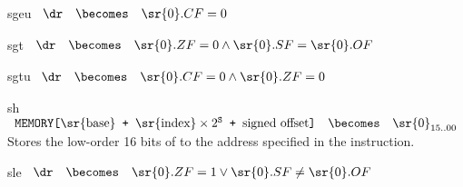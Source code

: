 \begin{instruction}{sgeu}
     {\sgeuopc}
     {
       \begin{math}
         \begin{array}{lcl}
           \dr & \becomes & \sr{0}.CF = 0 \\
         \end{array}
       \end{math}
     }
\end{instruction}


\begin{instruction}{sgt}
     {\sgtopc}
     {
       \begin{math}
         \begin{array}{lcl}
           \dr & \becomes & \sr{0}.ZF = 0 \wedge \sr{0}.SF = \sr{0}.OF \\
         \end{array}
       \end{math}
     }
\end{instruction}


\begin{instruction}{sgtu}
     {\sgtuopc}
     {
       \begin{math}
         \begin{array}{lcl}
           \dr & \becomes & \sr{0}.CF = 0 \wedge \sr{0}.ZF = 0 \\
         \end{array}
       \end{math}
     }
\end{instruction}


\begin{instruction}{sh}
     {\shopc}
     {
       \begin{math}
         \begin{array}{lcl}
           \texttt{MEMORY[\textrm{\sr{base}} + \(\textrm{\sr{index}}
               \times 2^\texttt{S}\) +  \textrm{signed offset}]}
           & \becomes & {\sr{0}}_{15..00}
         \end{array}
       \end{math}
     }
     {
       Stores the low-order 16 bits of  to the address
       specified in the instruction.
     }
\end{instruction}


\begin{instruction}{sle}
     {\sleopc}
     {
       \begin{math}
         \begin{array}{lcl}
           \dr & \becomes & \sr{0}.ZF = 1 \vee \sr{0}.SF \neq \sr{0}.OF \\
         \end{array}
       \end{math}
     }
\end{instruction}


